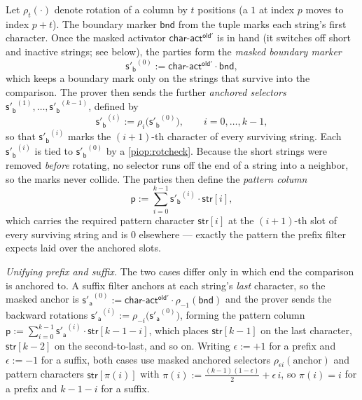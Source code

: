  Let $\rho_t(\cdot)$ denote rotation of a column by $t$ positions (a $1$ at index $p$ moves to index $p+t$). The boundary marker $\mathsf{bnd}$ from the tuple marks each string's first character. Once the masked activator $\mathsf{char\text{-}act^{old'}}$ is in hand (it switches off short and inactive strings; see below), the parties form the \emph{masked boundary marker}
\begin{displaymath}
  \mathsf{s'_b}^{(0)} := \mathsf{char\text{-}act^{old'}}\cdot\mathsf{bnd},
\end{displaymath}
which keeps a boundary mark only on the strings that survive into the comparison. The prover then sends the further \emph{anchored selectors} $\mathsf{s'_b}^{(1)},\ldots,\mathsf{s'_b}^{(k-1)}$, defined by
\begin{displaymath}
  \mathsf{s'_b}^{(i)} := \rho_{i}\bigl(\mathsf{s'_b}^{(0)}\bigr), \qquad i = 0,\ldots,k-1,
\end{displaymath}
so that $\mathsf{s'_b}^{(i)}$ marks the $(i{+}1)$-th character of every surviving string. Each $\mathsf{s'_b}^{(i)}$ is tied to $\mathsf{s'_b}^{(0)}$ by a \cref{piop:rotcheck}. Because the short strings were removed \emph{before} rotating, no selector runs off the end of a string into a neighbor, so the marks never collide. The parties then define the \emph{pattern column}
\begin{displaymath}
  \mathsf{p} := \sum_{i=0}^{k-1} \mathsf{s'_b}^{(i)}\cdot\mathsf{str}[i],
\end{displaymath}
which carries the required pattern character $\mathsf{str}[i]$ at the $(i{+}1)$-th slot of every surviving string and is $0$ elsewhere --- exactly the pattern the prefix filter expects laid over the anchored slots.

\emph{Unifying prefix and suffix.} The two cases differ only in which end the comparison is anchored to. A suffix filter anchors at each string's \emph{last} character, so the masked anchor is $\mathsf{s'_a}^{(0)} := \mathsf{char\text{-}act^{old'}}\cdot\rho_{-1}(\mathsf{bnd})$ and the prover sends the backward rotations $\mathsf{s'_a}^{(i)} := \rho_{-i}\bigl(\mathsf{s'_a}^{(0)}\bigr)$, forming the pattern column $\mathsf{p} := \sum_{i=0}^{k-1}\mathsf{s'_a}^{(i)}\cdot\mathsf{str}[k-1-i]$, which places $\mathsf{str}[k-1]$ on the last character, $\mathsf{str}[k-2]$ on the second-to-last, and so on. Writing $\epsilon := +1$ for a prefix and $\epsilon := -1$ for a suffix, both cases use masked anchored selectors $\rho_{\epsilon i}(\text{anchor})$ and pattern characters $\mathsf{str}[\pi(i)]$ with $\pi(i) := \tfrac{(k-1)(1-\epsilon)}{2} + \epsilon\, i$, so $\pi(i)=i$ for a prefix and $k-1-i$ for a suffix.


